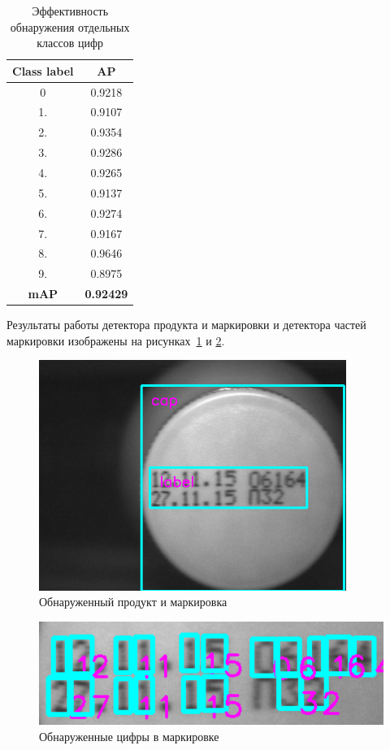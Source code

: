 \documentclass{thesisby}
\begin{document}
\begin{table}[h]
\caption{Эффективность обнаружения отдельных классов цифр}
\centering
\begin{tabular}{ | c | c |  }
\hline
Class label & AP \\ \hline
0 & 0.9218\\
1. & 0.9107\\
2. & 0.9354\\
3. & 0.9286\\
4. & 0.9265\\
5. & 0.9137\\
6. & 0.9274\\
7. & 0.9167\\
8. & 0.9646\\
9. & 0.8975\\
\hline
\textbf{mAP} & \textbf{0.92429}\\
\hline
\end{tabular}
\label{tab:efficiency_detector1}
\end{table}

Результаты работы детектора продукта и маркировки и детектора частей маркировки изображены на рисунках~\ref{fig:product_detect}  и \ref{fig:numbers_detect}.

\begin{figure}[!ht]
	\centering
	\includegraphics[width=10cm]{man-source/images/ch4/pic4-25.png}
	\caption{Обнаруженный продукт и маркировка}
	\label{fig:product_detect}
\end{figure}

\begin{figure}[!ht]
	\centering
	\includegraphics[width=12cm]{man-source/images/ch4/pic4-26.png}
	\caption{Обнаруженные цифры в маркировке}
	\label{fig:numbers_detect}
\end{figure}
\end{document}
